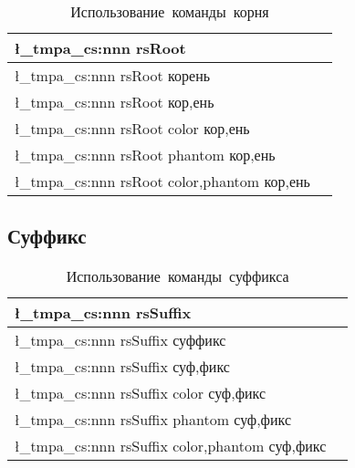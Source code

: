 \ExplSyntaxOn
\begin{tcolorbox}
\end{tcolorbox}

\renewcommand{\arraystretch}{1.125}
\begin{table}[ht!]
    \centering
    \begin{tabular}{@{}ll@{}}
        \toprule
        \l_tmpa_cs:nnn { rsRoot } {} { }                      \\ \midrule
        \l_tmpa_cs:nnn { rsRoot } {} { корень }               \\ \midrule
        \l_tmpa_cs:nnn { rsRoot } {} { кор,ень }              \\ \midrule
        \l_tmpa_cs:nnn { rsRoot } {color} { кор,ень }         \\ \midrule
        \l_tmpa_cs:nnn { rsRoot } {phantom} { кор,ень }       \\ \midrule
        \l_tmpa_cs:nnn { rsRoot } {color,phantom} { кор,ень } \\ \midrule
        \bottomrule
    \end{tabular}
    \caption{Использование~команды~корня}
\end{table}

\ExplSyntaxOff



\subsection{Суффикс}


\ExplSyntaxOn

\begin{tcolorbox}
\end{tcolorbox}

\renewcommand{\arraystretch}{1.125}
\begin{table}[ht!]
    \centering
    \begin{tabular}{@{}ll@{}}
        \toprule
        \l_tmpa_cs:nnn { rsSuffix } {} { }                       \\ \midrule
        \l_tmpa_cs:nnn { rsSuffix } {} { суффикс }               \\ \midrule
        \l_tmpa_cs:nnn { rsSuffix } {} { суф,фикс }              \\ \midrule
        \l_tmpa_cs:nnn { rsSuffix } {color} { суф,фикс }         \\ \midrule
        \l_tmpa_cs:nnn { rsSuffix } {phantom} { суф,фикс }       \\ \midrule
        \l_tmpa_cs:nnn { rsSuffix } {color,phantom} { суф,фикс } \\ \midrule
        \bottomrule
    \end{tabular}
    \caption{Использование~команды~суффикса}
\end{table}


